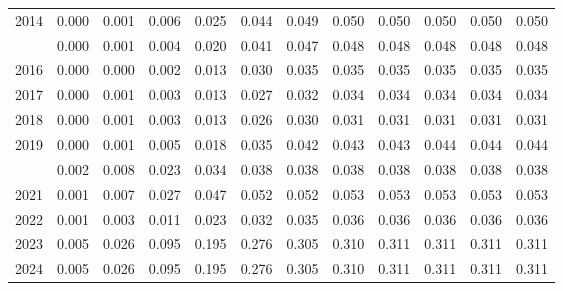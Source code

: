 \documentclass[
]{article}
\begin{document}
\begin{longtable}[t]{lrrrrrrrrrrr}
2014 & 0.000 & 0.001 & 0.006 & 0.025 & 0.044 & 0.049 & 0.050 & 0.050 & 0.050 & 0.050 & 0.050\\
\addlinespace
2015 & 0.000 & 0.001 & 0.004 & 0.020 & 0.041 & 0.047 & 0.048 & 0.048 & 0.048 & 0.048 & 0.048\\
2016 & 0.000 & 0.000 & 0.002 & 0.013 & 0.030 & 0.035 & 0.035 & 0.035 & 0.035 & 0.035 & 0.035\\
2017 & 0.000 & 0.001 & 0.003 & 0.013 & 0.027 & 0.032 & 0.034 & 0.034 & 0.034 & 0.034 & 0.034\\
2018 & 0.000 & 0.001 & 0.003 & 0.013 & 0.026 & 0.030 & 0.031 & 0.031 & 0.031 & 0.031 & 0.031\\
2019 & 0.000 & 0.001 & 0.005 & 0.018 & 0.035 & 0.042 & 0.043 & 0.043 & 0.044 & 0.044 & 0.044\\
\addlinespace
2020 & 0.002 & 0.008 & 0.023 & 0.034 & 0.038 & 0.038 & 0.038 & 0.038 & 0.038 & 0.038 & 0.038\\
2021 & 0.001 & 0.007 & 0.027 & 0.047 & 0.052 & 0.052 & 0.053 & 0.053 & 0.053 & 0.053 & 0.053\\
2022 & 0.001 & 0.003 & 0.011 & 0.023 & 0.032 & 0.035 & 0.036 & 0.036 & 0.036 & 0.036 & 0.036\\
2023 & 0.005 & 0.026 & 0.095 & 0.195 & 0.276 & 0.305 & 0.310 & 0.311 & 0.311 & 0.311 & 0.311\\
2024 & 0.005 & 0.026 & 0.095 & 0.195 & 0.276 & 0.305 & 0.310 & 0.311 & 0.311 & 0.311 & 0.311\\*
\end{longtable}
\end{document}

